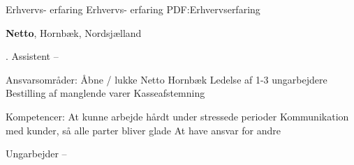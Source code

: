 


\Section
{Erhvervs- erfaring}
{Erhvervs-  erfaring}
{PDF:Erhvervserfaring}

\Entry
\textbf{Netto},
\newline
Hornbæk, Nordsjælland

\Gap
{}. Assistent
\hfill
{} -- 

\begin{Detail}
Ansvarsområder:
\SubBulletItem
Åbne / lukke Netto Hornbæk
\SubBulletItem
Ledelse af 1-3 ungarbejdere
\SubBulletItem
Bestilling af manglende varer
\SubBulletItem
Kasseafstemning

Kompetencer:
\SubBulletItem
At kunne arbejde hårdt under stressede perioder
\SubBulletItem
Kommunikation med kunder, så alle parter bliver glade
\SubBulletItem
At have ansvar for andre
\end{Detail}


\Gap
\BulletItem
Ungarbejder
\hfill
{} -- 

\Entry
